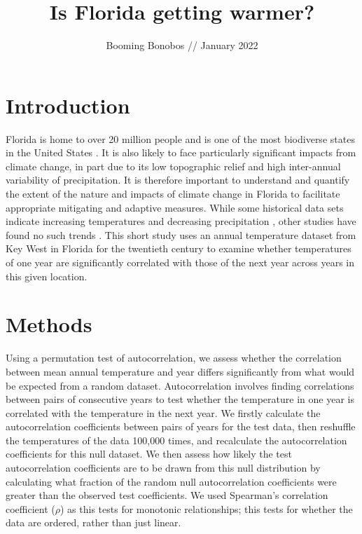 \documentclass{article}
\title{\textbf{Is Florida getting warmer?\vspace{-0.5em}}}
\author{Booming Bonobos // January 2022}
\date{}
\begin{document}
\maketitle

\section{Introduction \vspace{-0.5em}}

Florida is home to over 20 million people and is one of the most biodiverse states in the United States \cite{usda}. 
It is also likely to face particularly significant impacts from climate change, in part due to its low topographic 
relief and high inter-annual variability of precipitation. It is therefore important to understand and quantify the 
extent of the nature and impacts of climate change in Florida to facilitate appropriate mitigating and adaptive measures. 
While some historical data sets indicate increasing temperatures and decreasing precipitation \cite{irizarry2013historical}, 
other studies have found no such trends \cite{obeysekera2011climate}. This short study uses an annual temperature dataset 
from Key West in Florida for the twentieth century to examine whether temperatures of one year are significantly 
correlated with those of the next year across years in this given location. \vspace{-1em}

\section{Methods \vspace{-0.5em}}

Using a permutation test of autocorrelation, we assess whether the correlation between mean annual temperature and year 
differs significantly from what would be expected from a random dataset. Autocorrelation involves finding correlations 
between pairs of consecutive years to test whether the temperature in one year is correlated with the temperature in the 
next year. We firstly calculate the autocorrelation coefficients between pairs of years for the test data, then reshuffle 
the temperatures of the data 100,000 times, and recalculate the autocorrelation coefficients for this null dataset. We 
then assess how likely the test autocorrelation coefficients are to be drawn from this null distribution by calculating 
what fraction of the random null autocorrelation coefficients were greater than the observed test coefficients. We used 
Spearman's correlation coefficient ($\rho$) as this tests for monotonic relationships; this tests for whether the data are 
ordered, rather than just linear. \vspace{-1em}
\end{document}
